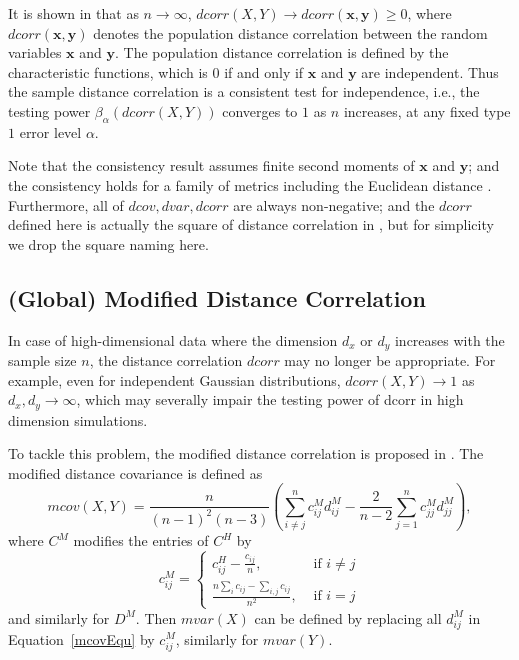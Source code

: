 \documentclass[11pt]{article}
\providecommand{\mb}[1]{\boldsymbol{#1}}
\begin{document}
It is shown in \cite{SzekelyRizzoBakirov2007} that as $n \rightarrow \infty$, $dcorr(X,Y) \rightarrow dcorr(\mb{x},\mb{y}) \geq 0$, where $dcorr(\mb{x},\mb{y})$ denotes the population distance correlation between the random variables $\mb{x}$ and $\mb{y}$. The population distance correlation is defined by the characteristic functions, which is $0$ if and only if $\mb{x}$ and $\mb{y}$ are independent. Thus the sample distance correlation is a consistent test for independence, i.e., the testing power $\beta_{\alpha}(dcorr(X,Y))$ converges to $1$ as $n$ increases, at any fixed type $1$ error level $\alpha$. 

Note that the consistency result assumes finite second moments of $\mb{x}$ and $\mb{y}$; and the consistency holds for a family of metrics including the Euclidean distance \cite{Lyons2013}. Furthermore, all of $dcov, dvar, dcorr$ are always non-negative; and the $dcorr$ defined here is actually the square of distance correlation in \cite{SzekelyRizzoBakirov2007}, but for simplicity we drop the square naming here.

\subsection{(Global) Modified Distance Correlation}
\label{sec:gmd}
In case of high-dimensional data where the dimension $d_{x}$ or $d_{y}$ increases with the sample size $n$, the distance correlation $dcorr$ may no longer be appropriate. For example, even for independent Gaussian distributions, $dcorr(X,Y) \rightarrow 1$ as $d_{x}, d_{y} \rightarrow \infty$, which may severally impair the testing power of dcorr in high dimension simulations.

To tackle this problem, the modified distance correlation is proposed in \cite{SzekelyRizzo2013a}. The modified distance covariance is defined as
\begin{equation}
\label{mcovEqu}
mcov(X,Y)=\frac{n}{(n-1)^2(n-3)}(\sum_{i \neq j}^{n}c^{M}_{ij}d^{M}_{ij}-\frac{2}{n-2}\sum_{j=1}^{n}c^{M}_{jj}d^{M}_{jj}),
\end{equation}
where $C^{M}$ modifies the entries of $C^{H}$ by
\[c^{M}_{ij} = \left\{
  \begin{array}{lr}
    c^{H}_{ij}-\frac{c_{ij}}{n}, & \mbox{ if } i \neq j \\
    \frac{n\sum_{i}c_{ij}-\sum_{i,j}c_{ij}}{n^2}, &\mbox{ if } i = j 
  \end{array}
\right.
\]
and similarly for $D^{M}$. Then $mvar(X)$ can be defined by replacing all $d^{M}_{ij}$ in Equation~\eqref{mcovEqu} by $c^{M}_{ij}$, similarly for $mvar(Y)$. 
\end{document}
